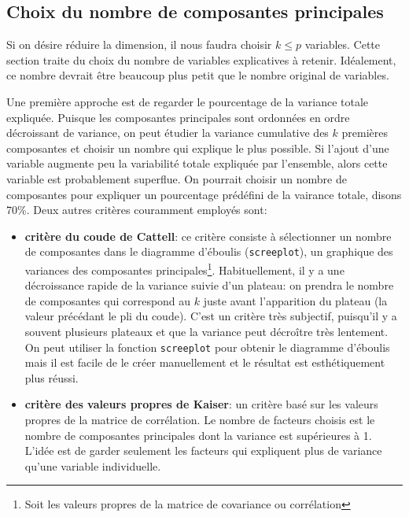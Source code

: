 \documentclass[
  11pt,
  letterpaper,
]{scrbook}
\providecommand{\tightlist}{%
  \setlength{\itemsep}{0pt}\setlength{\parskip}{0pt}}\usepackage{longtable,booktabs,array}
\theoremstyle{definition}
\theoremstyle{remark}
\begin{document}
\hypertarget{sec-acp-choix}{%
\subsection{Choix du nombre de composantes
principales}\label{sec-acp-choix}}

Si on désire réduire la dimension, il nous faudra choisir \(k \leq p\)
variables. Cette section traite du choix du nombre de variables
explicatives à retenir. Idéalement, ce nombre devrait être beaucoup plus
petit que le nombre original de variables.

Une première approche est de regarder le pourcentage de la variance
totale expliquée. Puisque les composantes principales sont ordonnées en
ordre décroissant de variance, on peut étudier la variance cumulative
des \(k\) premières composantes et choisir un nombre qui explique le
plus possible. Si l'ajout d'une variable augmente peu la variabilité
totale expliquée par l'ensemble, alors cette variable est probablement
superflue. On pourrait choisir un nombre de composantes pour expliquer
un pourcentage prédéfini de la vairance totale, disons 70\%. Deux autres
critères couramment employés sont:

\begin{itemize}
\tightlist
\item
  \textbf{critère du coude de Cattell}: ce critère consiste à
  sélectionner un nombre de composantes dans le diagramme d'éboulis
  (\texttt{screeplot}), un graphique des variances des composantes
  principales\footnote{Soit les valeurs propres de la matrice de
    covariance ou corrélation}. Habituellement, il y a une décroissance
  rapide de la variance suivie d'un plateau: on prendra le nombre de
  composantes qui correspond au \(k\) juste avant l'apparition du
  plateau (la valeur précédant le pli du coude). C'est un critère très
  subjectif, puisqu'il y a souvent plusieurs plateaux et que la variance
  peut décroître très lentement. On peut utiliser la fonction
  \texttt{screeplot} pour obtenir le diagramme d'éboulis mais il est
  facile de le créer manuellement et le résultat est esthétiquement plus
  réussi.
\item
  \textbf{critère des valeurs propres de Kaiser}: un critère basé sur
  les valeurs propres de la matrice de corrélation. Le nombre de
  facteurs choisis est le nombre de composantes principales dont la
  variance est supérieures à 1. L'idée est de garder seulement les
  facteurs qui expliquent plus de variance qu'une variable individuelle.
\end{itemize}
\end{document}
